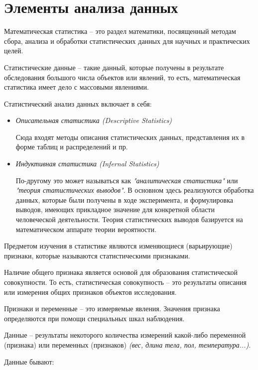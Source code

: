 \section{Элементы анализа данных}
Математическая статистика -- это раздел математики, посвященный методам сбора, анализа и обработки статистических данных для научных и практических целей.

Статистические данные -- такие данный, которые получены в результате обследования большого числа объектов или явлений, то есть, математическая статистика имеет дело с массовыми явлениями.

Статистический анализ данных включает в себя:

\begin{itemize}
	\item \textit{Описательная статистика (Descriptive Statistics)}
	
	Сюда входят методы описания статистических данных, представления их в форме таблиц и распределений и пр.
	
	\item \textit{Индуктивная статистика (Infernal Statistics)}
	
	По-другому это может называться как \textit{"аналитическая статистика"} или \textit{"теория статистических выводов"}. В основном здесь реализуются обработка данных, которые были получены в ходе эксперимента, и формулировка выводов, имеющих прикладное значение для конкретной области человеческой деятельности. Теория статистических выводов базируется на математическом аппарате теории вероятности.
\end{itemize}

Предметом изучения в статистике являются изменяющиеся (варьирующие) признаки, которые называются статистическими признаками.

Наличие общего признака является основой для образования статистической совокупности. То есть, статистическая совокупность -- это результаты описания или измерения общих признаков объектов исследования.

Признаки и переменные -- это измеряемые явления. Значения признака определяются при помощи специальных шкал наблюдения. 

Данные -- результаты некоторого количества измерений какой-либо переменной (признака) или переменных (признаков) \textit{(вес, длина тела, пол, температура...)}.

Данные бывают:


